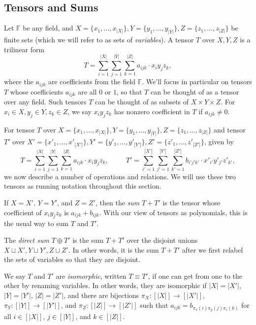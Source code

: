 \PassOptionsToPackage{shortlabels}{enumitem}\documentclass[10pt,a4paper]{article}
\newcommand{\F}{\mathbb{F}}
\begin{document}
\subsection{Tensors and Sums}

Let $\F$ be any field, and $X = \{x_1, \ldots, x_{|X|}\},Y=\{y_1,\ldots,y_{|Y|}\},Z=\{z_1, \ldots, z_{|Z|}\}$ be finite sets (which we will refer to as sets of \emph{variables}). A tensor $T$ over $X,Y,Z$ is a trilinear form $$T = \sum_{i=1}^{|X|} \sum_{j=1}^{|Y|} \sum_{k=1}^{|Z|} a_{ijk} \cdot x_i  y_j  z_k,$$ where the $a_{ijk}$ are coefficients from the field $\F$. We'll focus in particular on tensors $T$ whose coefficients $a_{ijk}$ are all $0$ or $1$, so that $T$ can be thought of as a tensor over any field. Such tensors $T$ can be thought of as subsets of $X \times Y \times Z$. For $x_i \in X, y_j \in Y, z_k \in Z$, we say $x_i  y_j  z_k$ has nonzero coefficient in $T$ if $a_{ijk} \neq 0$.

For tensor $T$ over $X = \{x_1, \ldots, x_{|X|}\},Y=\{y_1,\ldots,y_{|Y|}\},Z=\{z_1, \ldots, z_{|Z|}\}$ and tensor $T'$ over $X' = \{x'_1, \ldots, x'_{|X'|}\},Y'=\{y'_1,\ldots,y'_{|Y'|}\},Z'=\{z'_1, \ldots, z'_{|Z'|}\}$,  given by $$T = \sum_{i=1}^{|X|} \sum_{j=1}^{|Y|} \sum_{k=1}^{|Z|} a_{ijk} \cdot x_i  y_j  z_k, \hspace{30pt} T' = \sum_{i'=1}^{|X'|} \sum_{j'=1}^{|Y'|} \sum_{k'=1}^{|Z'|} b_{i'j'k'} \cdot x'_{i'}  y'_{j'}  z'_{k'},$$ we now describe a number of operations and relations. We will use these two tensors as running notation throughout this section.

If $X=X'$, $Y=Y'$, and $Z=Z'$, then the \emph{sum} $T+T'$ is the tensor whose coefficient of $x_iy_jz_k$ is $a_{ijk} + b_{ijk}$. With our view of tensors as polynomials, this is the usual way to sum $T$ and $T'$.

The \emph{direct sum} $T \oplus T'$ is the sum $T+T'$ over the disjoint unions $X \sqcup X', Y \sqcup Y', Z \sqcup Z'$. In other words, it is the sum $T+T'$ after we first relabel the sets of variables so that they are disjoint.

We say $T$ and $T'$ are \emph{isomorphic}, written $T \equiv T'$, if one can get from one to the other by renaming variables. In other words, they are isomorphic if $|X|=|X'|$, $|Y|=|Y'|$, $|Z|=|Z'|$, and there are bijections $\pi_X : [|X|] \to [|X'|]$, $\pi_Y : [|Y|] \to [|Y'|]$, and $\pi_Z : [|Z|] \to [|Z'|]$ such that $a_{ijk} = b_{\pi_x(i) \pi_y(j) \pi_z(k)}$ for all $i \in [|X|]$, $j \in [|Y|]$, and $k \in [|Z|]$.
\end{document}
